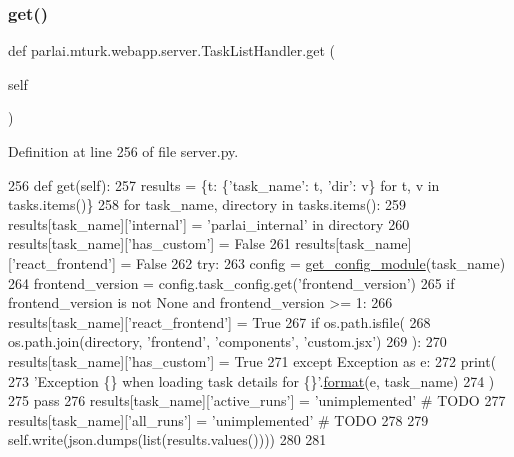 \subsubsection{\texorpdfstring{get()}{get()}}
{\footnotesize\ttfamily def parlai.\+mturk.\+webapp.\+server.\+Task\+List\+Handler.\+get (\begin{DoxyParamCaption}\item[{}]{self }\end{DoxyParamCaption})}



Definition at line 256 of file server.\+py.


\begin{DoxyCode}
256     \textcolor{keyword}{def }get(self):
257         results = \{t: \{\textcolor{stringliteral}{'task\_name'}: t, \textcolor{stringliteral}{'dir'}: v\} \textcolor{keywordflow}{for} t, v \textcolor{keywordflow}{in} tasks.items()\}
258         \textcolor{keywordflow}{for} task\_name, directory \textcolor{keywordflow}{in} tasks.items():
259             results[task\_name][\textcolor{stringliteral}{'internal'}] = \textcolor{stringliteral}{'parlai\_internal'} \textcolor{keywordflow}{in} directory
260             results[task\_name][\textcolor{stringliteral}{'has\_custom'}] = \textcolor{keyword}{False}
261             results[task\_name][\textcolor{stringliteral}{'react\_frontend'}] = \textcolor{keyword}{False}
262             \textcolor{keywordflow}{try}:
263                 config = \hyperlink{namespaceparlai_1_1mturk_1_1webapp_1_1server_aee065cfdb6346d4815762ae793427f1e}{get\_config\_module}(task\_name)
264                 frontend\_version = config.task\_config.get(\textcolor{stringliteral}{'frontend\_version'})
265                 \textcolor{keywordflow}{if} frontend\_version \textcolor{keywordflow}{is} \textcolor{keywordflow}{not} \textcolor{keywordtype}{None} \textcolor{keywordflow}{and} frontend\_version >= 1:
266                     results[task\_name][\textcolor{stringliteral}{'react\_frontend'}] = \textcolor{keyword}{True}
267                 \textcolor{keywordflow}{if} os.path.isfile(
268                     os.path.join(directory, \textcolor{stringliteral}{'frontend'}, \textcolor{stringliteral}{'components'}, \textcolor{stringliteral}{'custom.jsx'})
269                 ):
270                     results[task\_name][\textcolor{stringliteral}{'has\_custom'}] = \textcolor{keyword}{True}
271             \textcolor{keywordflow}{except} Exception \textcolor{keyword}{as} e:
272                 print(
273                     \textcolor{stringliteral}{'Exception \{\} when loading task details for \{\}'}.\hyperlink{namespaceparlai_1_1chat__service_1_1services_1_1messenger_1_1shared__utils_a32e2e2022b824fbaf80c747160b52a76}{format}(e, task\_name)
274                 )
275                 \textcolor{keywordflow}{pass}
276             results[task\_name][\textcolor{stringliteral}{'active\_runs'}] = \textcolor{stringliteral}{'unimplemented'}  \textcolor{comment}{# TODO}
277             results[task\_name][\textcolor{stringliteral}{'all\_runs'}] = \textcolor{stringliteral}{'unimplemented'}  \textcolor{comment}{# TODO}
278 
279         self.write(json.dumps(list(results.values())))
280 
281 
\end{DoxyCode}
